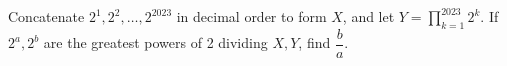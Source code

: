 Concatenate $2^1,2^2,\ldots,2^{2023}$ in decimal order to form $X$, and let $Y=\prod_{k=1}^{2023}2^k$. If $2^a,2^b$ are the greatest powers of 2 dividing $X,Y$, find $\dfrac{b}{a}$.
